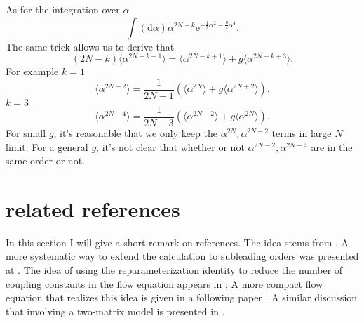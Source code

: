 As for the integration over $\alpha$
\[
	\int (\mathrm{d}\alpha) \alpha^{2N - k} \mathrm{e}^{- \frac{1}{2} \alpha^2 - \frac{g}{4} \alpha^4}
.\] 
The same trick allows us to derive that
\[
	(2N-k) \langle \alpha^{2N-k-1}\rangle = \langle \alpha^{2N-k + 1} \rangle + g \langle \alpha^{2N-k+3} \rangle
.\] 
For example $k=1$
\[
	\langle \alpha^{2N-2} \rangle = \frac{1}{2N-1} (\langle \alpha^{2N} \rangle + g \langle \alpha^{2N+2}\rangle)
.\] 
$k=3$
\[
	\langle \alpha^{2N-4} \rangle = \frac{1}{2N-3}(\langle \alpha^{2N-2} \rangle + g \langle \alpha^{2N} \rangle)
.\] 
For small $g$, it's reasonable that we only keep the $\alpha^{2N},\alpha^{2N-2}$ terms in large $N$ limit.
For a general $g$, it's not clear that whether or not $\alpha^{2N-2},\alpha^{2N-4}$ are in the same order or not.

\section{related references}

In this section I will give a short remark on references.
The idea stems from .
A more systematic way to extend the calculation to subleading orders was presented at .
The idea of using the reparameterization identity to reduce the number of coupling constants in the flow equation appears in ;
A more compact flow equation that realizes this idea is given in a following paper .
A similar discussion that involving a two-matrix model is presented in .
